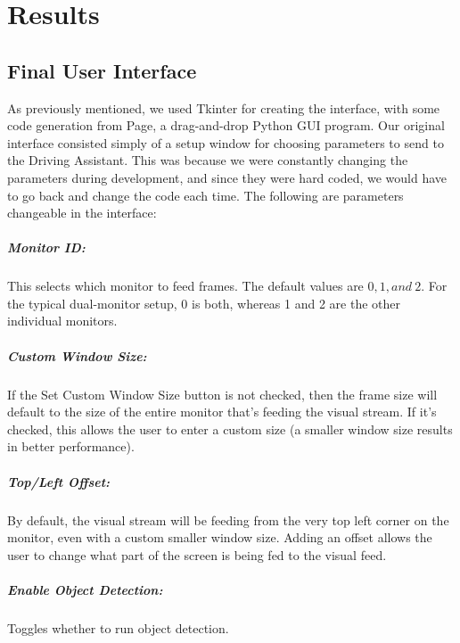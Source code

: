 \chapter{Results}

\section{Final User Interface}
As previously mentioned, we used Tkinter for creating the interface, with some code generation from Page, a drag-and-drop Python GUI program.  Our original interface consisted simply of a setup window for choosing parameters to send to the Driving Assistant.  This was because we were constantly changing the parameters during development, and since they were hard coded, we would have to go back and change the code each time.  The following are parameters changeable in the interface:

\paragraph{Monitor ID:} This selects which monitor to feed frames. The default values are $0, 1, and~ 2$. For the typical dual-monitor setup, 0 is both, whereas 1 and 2 are the other individual monitors.

\paragraph{Custom Window Size:} If the Set Custom Window Size button is not checked, then the frame size will default to the size of the entire monitor that's feeding the visual stream. If it's checked, this allows the user to enter a custom size (a smaller window size results in better performance).

\paragraph{Top/Left Offset:} By default, the visual stream will be feeding from the very top left corner on the monitor, even with a custom smaller window size. Adding an offset allows the user to change what part of the screen is being fed to the visual feed.

\paragraph{Enable Object Detection:} Toggles whether to run object detection.

